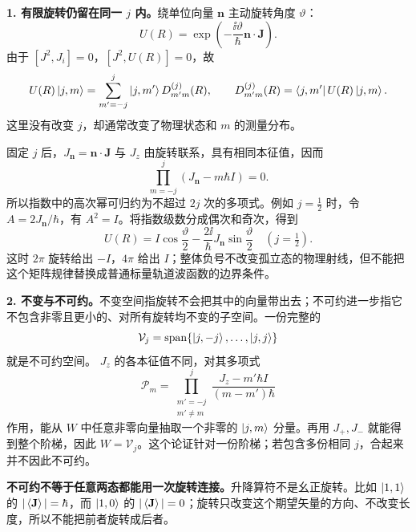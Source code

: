 \textbf{1. 有限旋转仍留在同一 $j$ 内。}绕单位向量 $\mathbf n$ 主动旋转角度 $\vartheta$：
\begin{equation}
  U(R)=\exp\left(-\frac{\ii\vartheta}{\hbar}\mathbf n\cdot\mathbf J\right).
\end{equation}
由于 $[J^2,J_i]=0$，$[J^2,U(R)]=0$，故
\begin{equation}
  U(R)\left|j,m\right\rangle
    =\sum_{m'=-j}^j\left|j,m'\right\rangle D^{(j)}_{m'm}(R),\qquad
  D^{(j)}_{m'm}(R)=\left\langle j,m'\right|U(R)\left|j,m\right\rangle.
\end{equation}
这里没有改变 $j$，却通常改变了物理状态和 $m$ 的测量分布。

固定 $j$ 后，$J_{\mathbf n}=\mathbf n\cdot\mathbf J$ 与 $J_z$ 由旋转联系，具有相同本征值，因而
\begin{equation}
  \prod_{m=-j}^j(J_{\mathbf n}-m\hbar I)=0.
\end{equation}
所以指数中的高次幂可归约为不超过 $2j$ 次的多项式。例如 $j=\tfrac12$ 时，令 $A=2J_{\mathbf n}/\hbar$，有 $A^2=I$。将指数级数分成偶次和奇次，得到
\begin{equation}
  \boxed{U(R)=I\cos\frac\vartheta2
     -\frac{2\ii}{\hbar}J_{\mathbf n}\sin\frac\vartheta2
       \quad(j=\tfrac12).}
\end{equation}
这时 $2\pi$ 旋转给出 $-I$，$4\pi$ 给出 $I$；整体负号不改变孤立态的物理射线，但不能把这个矩阵规律替换成普通标量轨道波函数的边界条件。

\textbf{2. 不变与不可约。}不变空间指旋转不会把其中的向量带出去；不可约进一步指它不包含非零且更小的、对所有旋转均不变的子空间。一份完整的
\begin{equation}
  \mathcal V_j=\operatorname{span}\{\left|j,-j\right\rangle,\ldots,\left|j,j\right\rangle\}
\end{equation}
就是不可约空间。
$J_z$ 的各本征值不同，对其多项式
\begin{equation}
  \mathcal P_m=
    \prod_{\substack{m'=-j\\m'\ne m}}^j
      \frac{J_z-m'\hbar I}{(m-m')\hbar}
\end{equation}
作用，能从 $W$ 中任意非零向量抽取一个非零的 $\left|j,m\right\rangle$ 分量。再用 $J_+,J_-$ 就能得到整个阶梯，因此 $W=\mathcal V_j$。这个论证针对一份阶梯；若包含多份相同 $j$，合起来并不因此不可约。

\textbf{不可约不等于任意两态都能用一次旋转连接。}升降算符不是幺正旋转。比如 $\left|1,1\right\rangle$ 的 $|\left\langle \mathbf J \right\rangle|=\hbar$，而 $\left|1,0\right\rangle$ 的 $|\left\langle \mathbf J \right\rangle|=0$；旋转只改变这个期望矢量的方向、不改变长度，所以不能把前者旋转成后者。

